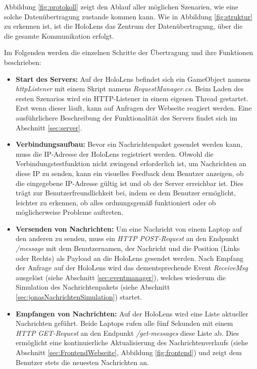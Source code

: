 Abbildung \ref{fig:protokoll} zeigt den Ablauf aller möglichen Szenarien, wie eine solche Datenübertragung zustande kommen kann. Wie in Abbildung \ref{fig:struktur} zu erkennen ist, ist die HoloLens das Zentrum der Datenübertragung, über die die gesamte Kommunikation erfolgt.

Im Folgenden werden die einzelnen Schritte der Übertragung und ihre Funktionen beschrieben:

\begin{itemize}
    \item \textbf{Start des Servers:} Auf der HoloLens befindet sich ein GameObject namens \textit{httpListener} mit einem Skript namens \textit{RequestManager.cs}. Beim Laden des ersten Szenarios wird ein HTTP-Listener in einem eigenen Thread gestartet. Erst wenn dieser läuft, kann auf Anfragen der Webseite reagiert werden. Eine ausführlichere Beschreibung der Funktionalität des Servers findet sich im Abschnitt \ref{sec:server}.
    \item \textbf{Verbindungsaufbau:} Bevor ein Nachrichtenpaket gesendet werden kann, muss die IP-Adresse der HoloLens registriert werden. Obwohl die Verbindungstestfunktion nicht zwingend erforderlich ist, um Nachrichten an diese IP zu senden, kann ein visuelles Feedback dem Benutzer anzeigen, ob die eingegebene IP-Adresse gültig ist und ob der Server erreichbar ist. Dies trägt zur Benutzerfreundlichkeit bei, indem es dem Benutzer ermöglicht, leichter zu erkennen, ob alles ordnungsgemäß funktioniert oder ob möglicherweise Probleme auftreten.
    \item \textbf{Versenden von Nachrichten:} Um eine Nachricht von einem Laptop auf den anderen zu senden, muss ein \textit{HTTP POST-Request} an den Endpunkt \textit{/message} mit dem Benutzernamen, der Nachricht und die Position (Links oder Rechts) als Payload an die HoloLens gesendet werden. Nach Empfang der Anfrage auf der HoloLens wird das dementsprechende Event \textit{ReceiveMsg} ausgelöst (siehe Abschnitt \ref{sec:eventmanager}), welches wiederum die Simulation des Nachrichtenpakets (siehe Abschnitt \ref{sec:jonasNachrichtenSimulation}) startet.
    \item \textbf{Empfangen von Nachrichten:} Auf der HoloLens wird eine Liste aktueller Nachrichten geführt. Beide Laptops rufen alle fünf Sekunden mit einem \textit{HTTP GET-Request} an den Endpunkt \textit{/get-messages} diese Liste ab. Dies ermöglicht eine kontinuierliche Aktualisierung des Nachrichtenverlaufs (siehe Abschnitt \ref{sec:FrontendWebseite}, Abbildung \ref{fig:frontend}) und zeigt dem Benutzer stets die neuesten Nachrichten an.
\end{itemize}

